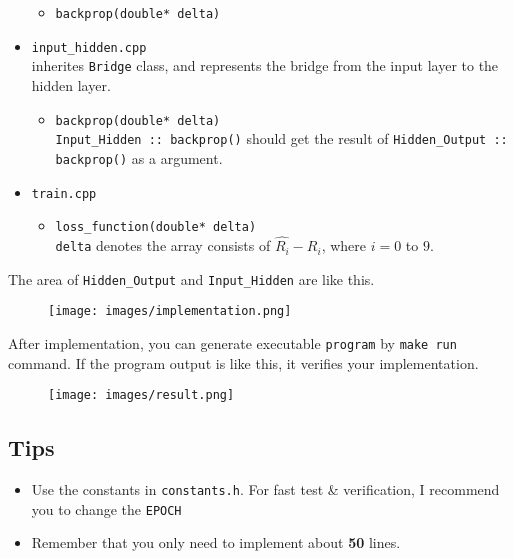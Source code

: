 \documentclass{oblivoir}
\begin{document}
\begin{itemize}
    \begin{itemize}
        \item \texttt{backprop(double* delta)}
    \end{itemize}
    \item \texttt{input\_hidden.cpp}
    \\ inherites \texttt{Bridge} class, and represents the bridge from the input layer to the hidden layer.
    \begin{itemize}
        \item \texttt{backprop(double* delta)} \\
        \texttt{Input\_Hidden :: backprop()} should get the result of \texttt{Hidden\_Output :: backprop()} as a argument.
    \end{itemize}
    \item \texttt{train.cpp}
    \begin{itemize}
        \item \texttt{loss\_function(double* delta)} \\
        \texttt{delta} denotes the array consists of $\hat{R_i} - R_i$, where $i = 0$ to $9$.
    \end{itemize}
\end{itemize}
The area of \texttt{Hidden\_Output} and \texttt{Input\_Hidden} are like this. 

\begin{figure}[h]
    \centering
    \texttt{[image: images/implementation.png]}
\end{figure}

After implementation, you can generate executable \texttt{program} by \texttt{make run} command. If the program output is like this, it verifies your implementation.

\begin{figure}[h]
    \centering
    \texttt{[image: images/result.png]}
\end{figure}

\subsection{Tips}

\begin{itemize}
    \item Use the constants in \texttt{constants.h}. For fast test \& verification, I recommend you to change the \texttt{EPOCH}
    \item Remember that you only need to implement about \textbf{50} lines. 
\end{itemize}
\end{document}
